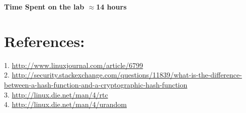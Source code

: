 \documentclass[10pt] {article}
\begin{document}
\noindent \textbf{Time Spent on the lab \ensuremath{\approx}14 hours} 

\section{References:}
1. \url{http://www.linuxjournal.com/article/6799}  \\
2. \url{http://security.stackexchange.com/questions/11839/what-is-the-difference-between-a-hash-function-and-a-cryptographic-hash-function} \\
3. \url{http://linux.die.net/man/4/rtc} \\
4. \url{http://linux.die.net/man/4/urandom}
\end{document}
